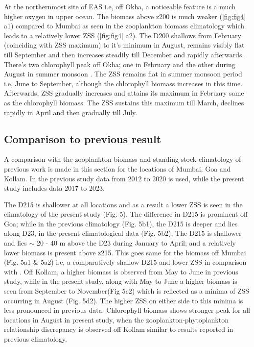 \documentclass{article}
\begin{document}
	 At the northernmost site of EAS i.e, off Okha, a noticeable feature is a much higher oxygen in upper ocean. The biomass above z200 is much weaker (\cref{fig:fig4} a1) compared to Mumbai as seen in the zooplankton biomass climatology which leads to a relatively lower ZSS (\cref{fig:fig4} a2). The D200 shallows from February (coinciding with ZSS maximum) to it's minimum in August,  remains visibly flat till September and then increases steadily till December and rapidly afterwards. There's two chlorophyll peak off Okha; one in February \citep{keerthi2017physical} and the other during August in summer monsoon \citep{levy2007basin}. The ZSS remains flat in summer monsoon period i.e, June to September, although the chlorophyll biomass increases in this time. Afterwards, ZSS gradually increases and attains its maximum in February same as the chlorophyll biomass. The ZSS sustains this maximum till March, declines rapidly in April and then gradually till July.
	 
	\subsection{Comparison to previous result}	 
	A comparison with the zooplankton biomass and standing stock climatology of previous work \citep{aparna2022seasonal} is made in this section for the locations of Mumbai, Goa and Kollam. In the previous study data from 2012 to 2020 is used, while the present study includes data 2017 to 2023.
	 
	The D215 is shallower at all locations and as a result a lower ZSS is seen in the climatology of the present study (Fig. 5). The difference in D215 is prominent off Goa; while in the previous climatology (Fig. 5b1), the D215 is deeper and lies along D23, in the present climatological data (Fig. 5b2), The D215 is shallower and lies $\sim$ 20 - 40 m above the D23 during January to April; and a relatively lower biomass is present above z215. This goes same for the biomass off Mumbai (Fig. 5a1 \& 5a2) i.e, a comparatively shallow D215 and lower ZSS in comparison with \citep{aparna2022seasonal}. Off Kollam, a higher biomass is observed from May to June in previous study, while in the present study, along with May to June a higher biomass is seen from September to November(Fig 5c2) which is reflected as a minima of ZSS occurring in August (Fig. 5d2). The higher ZSS on either side to this minima is less pronounced in previous data. Chlorophyll biomass shows stronger peak for all locations in August in present study, when the zooplankton-phytoplankton relationship discrepancy is observed off Kollam similar to results reported in previous climatology.
	 	
\end{document}
